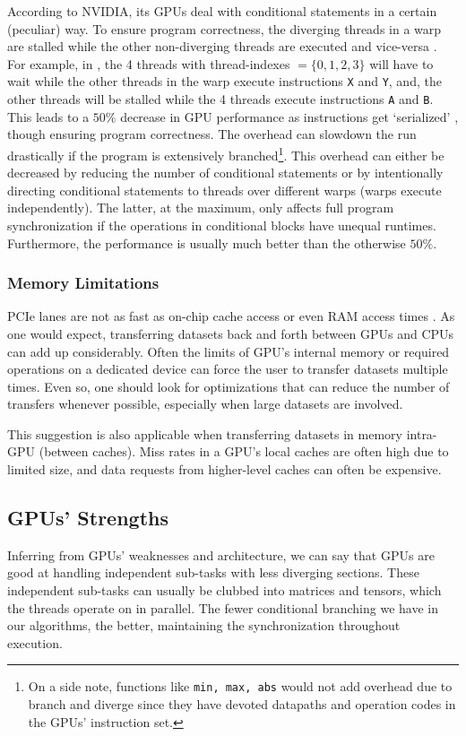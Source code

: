 According to NVIDIA, its GPUs deal with conditional statements in a certain (peculiar) way. To ensure program correctness, the diverging threads in a warp are stalled while the other non-diverging threads are executed and vice-versa \cite{CUDADocs,ParallelNVIDIA}. For example, in , the 4 threads with thread-indexes $=\{0,1,2,3\}$ will have to wait while the other threads in the warp execute instructions \texttt{X} and \texttt{Y}, and, the other threads will be stalled while the 4 threads execute instructions \texttt{A} and \texttt{B}. This leads to a $50\%$ decrease in GPU performance as instructions get `serialized' \cite{ParallelNVIDIA}, though ensuring program correctness. The overhead can slowdown the run drastically if the program is extensively branched\footnote{On a side note, functions like \texttt{min, max, abs} would not add overhead due to branch and diverge since they have devoted datapaths and operation codes in the GPUs' instruction set.}. This overhead can either be decreased by reducing the number of conditional statements or by intentionally directing conditional statements to threads over different warps (warps execute independently). The latter, at the maximum, only affects full program synchronization if the operations in conditional blocks have unequal runtimes. Furthermore, the performance is usually much better than the otherwise $50\%$.

\subsubsection{Memory Limitations}
PCIe lanes are not as fast as on-chip cache access or even RAM access times \cite{CUDADocs, ParallelNVIDIA}. As one would expect, transferring datasets back and forth between GPUs and CPUs can add up considerably. Often the limits of GPU's internal memory or required operations on a dedicated device can force the user to transfer datasets multiple times. Even so, one should look for optimizations that can reduce the number of transfers whenever possible, especially when large datasets are involved.

This suggestion is also applicable when transferring datasets in memory intra-GPU (between caches). Miss rates in a GPU's local caches are often high due to limited size, and data requests from higher-level caches can often be expensive.

\subsection{GPUs' Strengths} \label{sec:Gpu's Strengths}
Inferring from GPUs' weaknesses and architecture, we can say that GPUs are good at handling independent sub-tasks with less diverging sections. These independent sub-tasks can usually be clubbed into matrices and tensors, which the threads operate on in parallel. The fewer conditional branching we have in our algorithms, the better, maintaining the synchronization throughout execution.

